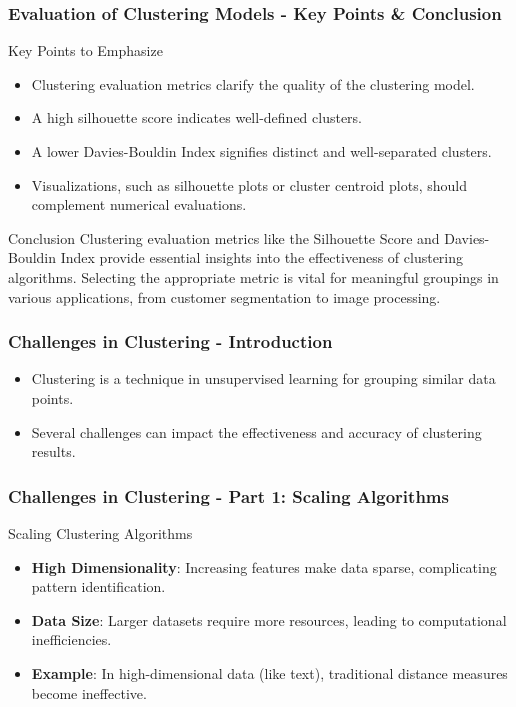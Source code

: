 \documentclass[aspectratio=169]{beamer}
\begin{document}
\begin{frame}[fragile]
    \frametitle{Evaluation of Clustering Models - Key Points & Conclusion}
    \begin{block}{Key Points to Emphasize}
        \begin{itemize}
            \item Clustering evaluation metrics clarify the quality of the clustering model.
            \item A high silhouette score indicates well-defined clusters.
            \item A lower Davies-Bouldin Index signifies distinct and well-separated clusters.
            \item Visualizations, such as silhouette plots or cluster centroid plots, should complement numerical evaluations.
        \end{itemize}
    \end{block}
    
    \begin{block}{Conclusion}
        Clustering evaluation metrics like the Silhouette Score and Davies-Bouldin Index provide essential insights into the effectiveness of clustering algorithms. Selecting the appropriate metric is vital for meaningful groupings in various applications, from customer segmentation to image processing.
    \end{block}
\end{frame}

\begin{frame}[fragile]
    \frametitle{Challenges in Clustering - Introduction}
    \begin{itemize}
        \item Clustering is a technique in unsupervised learning for grouping similar data points.
        \item Several challenges can impact the effectiveness and accuracy of clustering results.
    \end{itemize}
\end{frame}

\begin{frame}[fragile]
    \frametitle{Challenges in Clustering - Part 1: Scaling Algorithms}
    \begin{block}{Scaling Clustering Algorithms}
        \begin{itemize}
            \item \textbf{High Dimensionality}: Increasing features make data sparse, complicating pattern identification.
            \item \textbf{Data Size}: Larger datasets require more resources, leading to computational inefficiencies.
            \item \textbf{Example}: In high-dimensional data (like text), traditional distance measures become ineffective.
        \end{itemize}
    \end{block}
\end{frame}
\end{document}
